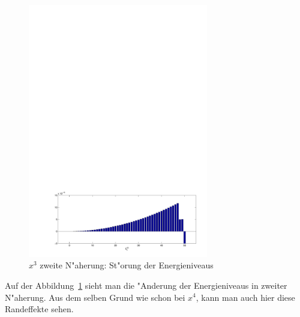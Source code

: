 \begin{refsection}
\begin{figure}	%
\centering
\includegraphics[width=0.7\textwidth]{anharmonisch/images/x3/EK2.pdf}
\caption{$x^3$ zweite N"aherung: St"orung der Energieniveaus  
\label{skript:x3_EK2}}
\end{figure}

Auf der Abbildung~\ref{skript:x3_EK2} sieht man die "Anderung der Energieniveaus
in zweiter N"aherung.
Aus dem selben Grund wie schon bei $x^4$, kann man auch hier diese Randeffekte
sehen.


\end{refsection}
